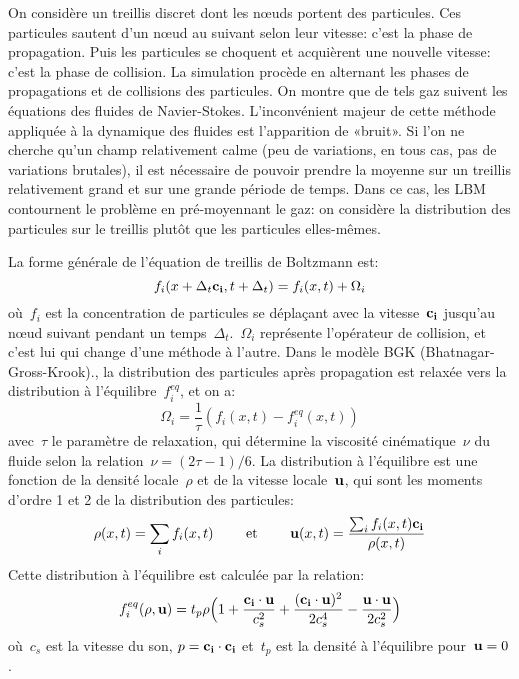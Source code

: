 On considère un treillis discret dont les nœuds portent des particules. Ces particules sautent d'un nœud au suivant selon leur vitesse: c'est la phase de propagation. Puis les particules se choquent et acquièrent une nouvelle vitesse: c'est la phase de collision. La simulation procède en alternant les phases de propagations et de collisions des particules. On montre que de tels gaz suivent les équations des fluides de Navier-Stokes. L'inconvénient majeur de cette méthode appliquée à la dynamique des fluides est l'apparition de «bruit». Si l'on ne cherche qu'un champ relativement calme (peu de variations, en tous cas, pas de variations brutales), il est nécessaire de pouvoir prendre la moyenne sur un treillis relativement grand et sur une grande période de temps. Dans ce cas, les LBM contournent le problème en pré-moyennant le gaz: on considère la distribution des particules sur le treillis plutôt que les particules elles-mêmes.

\medskip
La forme générale de l'équation de treillis de Boltzmann est:
\begin{equation}
f_i(x+\Delta_t \mathbf{c_i}, t+\Delta_t) = f_i(x,t) + \Omega_i
\end{equation}
où~$f_i$ est la concentration de particules se déplaçant avec la vitesse~$\mathbf{c_i}$ jusqu'au nœud suivant pendant un temps~$\Delta_t$.~$\Omega_i$ représente l'opérateur de collision, et c'est lui qui change d'une méthode à l'autre. Dans le modèle BGK (Bhatnagar-Gross-Krook)., la distribution des particules après propagation est relaxée vers la distribution à l'équilibre~$f_i^{eq}$, et on a:
\begin{equation}
\Omega_i = \frac1{\tau}\left(f_i(x,t)-f_i^{eq}(x,t)\right)
\end{equation}
avec~$\tau$ le paramètre de relaxation, qui détermine la viscosité cinématique~$\nu$ du fluide selon la relation~$\nu=(2\tau -1)/6$. La distribution à l'équilibre est une fonction de la densité locale~$\rho$ et de la vitesse locale~$\mathbf{u}$, qui sont les moments d'ordre 1 et 2 de la distribution des particules:
\begin{equation}
\rho(x,t) = \displaystyle\sum_i f_i(x,t) \qquad\text{ et }\qquad \mathbf{u}(x,t)=\dfrac{\sum_i f_i(x,t)\mathbf{c_i}}{\rho(x,t)}
\end{equation}
Cette distribution à l'équilibre est calculée par la relation:
\begin{equation}
f_i^{eq}(\rho,\mathbf{u}) = t_p \rho \Bigl(1+\dfrac{\mathbf{c_i}\cdot\mathbf{u}}{c_s^2} + \dfrac{(\mathbf{c_i}\cdot\mathbf{u})^2}{2c_s^4} - \dfrac{\mathbf{u}\cdot\mathbf{u}}{2c_s^2}\Bigr)
\end{equation}
où~$c_s$ est la vitesse du son, $p=\mathbf{c_i}\cdot\mathbf{c_i}$ et~$t_p$ est la densité à l'équilibre pour~$\mathbf{u}=0$.






